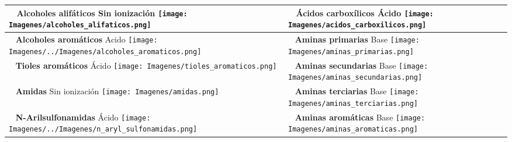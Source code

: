 \documentclass[12pt,a4paper]{article}
\begin{document}
\begin{longtable}{|P{8cm}|P{8cm}|}
	
	\hline 
	~ \newline \textbf{Alcoholes alifáticos} \newline Sin ionización \newline  \texttt{[image: Imagenes/alcoholes\_alifaticos.png]} &  
	~ \newline \textbf{Ácidos carboxílicos} \newline Ácido \newline \texttt{[image: Imagenes/acidos\_carboxilicos.png]} 
	\\ 
	\hline
	~ \newline \textbf{Alcoholes aromáticos} \newline Acido \newline \texttt{[image: Imagenes/../Imagenes/alcoholes\_aromaticos.png]} & 
	~ \newline \textbf{Aminas primarias}  \newline Base \newline \texttt{[image: Imagenes/aminas\_primarias.png]}
	\\
	\hline
	~ \newline \textbf{Tioles aromáticos} \newline Ácido \newline \texttt{[image: Imagenes/tioles\_aromaticos.png]} & 
	~ \newline \textbf{Aminas secundarias} \newline Base \newline \texttt{[image: Imagenes/aminas\_secundarias.png]} \\
	\hline
	~ \newline \textbf{Amidas} \newline Sin ionización \newline \texttt{[image: Imagenes/amidas.png]} & 
	~ \newline \textbf{Aminas terciarias} \newline Base \newline \texttt{[image: Imagenes/aminas\_terciarias.png]} \\
	\hline
	~ \newline \textbf{N-Arilsulfonamidas} \newline Ácido \newline \texttt{[image: Imagenes/../Imagenes/n\_aryl\_sulfonamidas.png]} & 
	~ \newline \textbf{Aminas aromáticas} \newline Base \newline \texttt{[image: Imagenes/aminas\_aromaticas.png]}  \\

\end{longtable}
\end{document}
